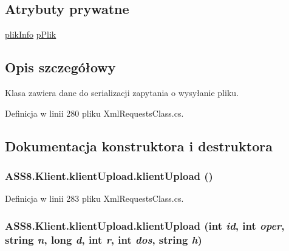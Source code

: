 \subsection*{Atrybuty prywatne}
\begin{CompactItemize}
\item 
\hyperlink{a00018}{plikInfo} \hyperlink{a00011_b6779c02575a79c4964354a61dd9088f}{pPlik}
\end{CompactItemize}


\subsection{Opis szczegółowy}
Klasa zawiera dane do serializacji zapytania o wysyłanie pliku. 



Definicja w linii 280 pliku XmlRequestsClass.cs.

\subsection{Dokumentacja konstruktora i destruktora}
\hypertarget{a00011_360231a3cc7ad8d86b5245eaeec18711}{
\subsubsection[{klientUpload}]{\setlength{\rightskip}{0pt plus 5cm}ASS8.Klient.klientUpload.klientUpload ()}}
\label{da/d45/a00011_360231a3cc7ad8d86b5245eaeec18711}




Definicja w linii 283 pliku XmlRequestsClass.cs.\hypertarget{a00011_8a61f3de65e9fe569185ad9a70c8865f}{
\subsubsection[{klientUpload}]{\setlength{\rightskip}{0pt plus 5cm}ASS8.Klient.klientUpload.klientUpload (int {\em id}, \/  int {\em oper}, \/  string {\em n}, \/  long {\em d}, \/  int {\em r}, \/  int {\em dos}, \/  string {\em h})}}
\label{da/d45/a00011_8a61f3de65e9fe569185ad9a70c8865f}




